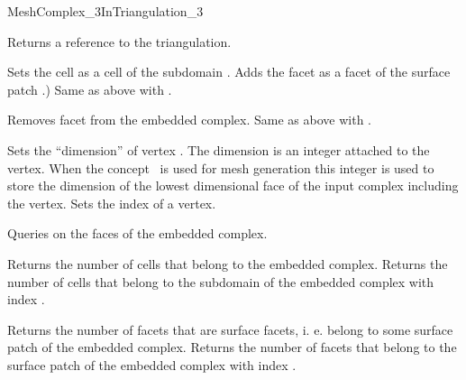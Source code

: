 \begin{ccRefConcept}{MeshComplex_3InTriangulation_3}
\begin{ccAdvanced}
{Returns a reference to the triangulation.}
\end{ccAdvanced}

\ccModifiers

{Sets  the cell  as a cell of  the subdomain  .}
\ccGlue
{}
{Adds  the facet  as a facet of the surface patch  .)}
\ccGlue
{}
{Same as above with .}

\ccGlue
{}
{Removes facet  from  the embedded complex.}
\ccGlue
{}
{Same as above with .}

{Sets the  ``dimension''  of vertex .  The dimension is an integer attached to the vertex.
When the concept \ccRefName\ is used for mesh generation this integer is used to store
the dimension of the  lowest dimensional face of the input complex including the vertex.}
\ccGlue
{}
{Sets the index of a vertex.}


Queries on the  faces of the embedded complex.

{Returns the number of cells that belong to the embedded complex.}
\ccGlue
{}
{Returns the number of cells that belong to the subdomain of the embedded complex with index .}


{Returns the number of facets that are surface facets, i. e. belong to some surface patch
of  the embedded complex.}
\ccGlue
{}
{Returns the number of facets that belong to the surface patch
of  the embedded complex with index .}





\end{ccRefConcept}
